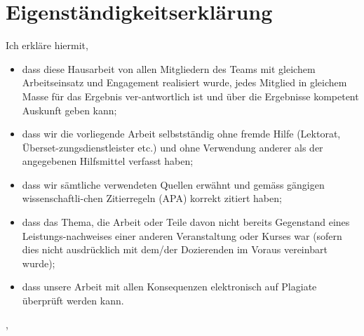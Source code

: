\section*{Eigenständigkeitserklärung}
Ich erkläre hiermit,
\begin{itemize}
\item dass diese Hausarbeit von allen Mitgliedern des Teams mit gleichem Arbeitseinsatz und Engagement realisiert wurde, jedes Mitglied in gleichem Masse für das Ergebnis ver-antwortlich ist und über die Ergebnisse kompetent Auskunft geben kann;
\item dass wir die vorliegende Arbeit selbstständig ohne fremde Hilfe (Lektorat, Überset-zungsdienstleister etc.) und ohne Verwendung anderer als der angegebenen Hilfsmittel verfasst haben;
\item dass wir sämtliche verwendeten Quellen erwähnt und gemäss gängigen wissenschaftli-chen Zitierregeln (APA) korrekt zitiert haben;
\item dass das Thema, die Arbeit oder Teile davon nicht bereits Gegenstand eines Leistungs-nachweises einer anderen Veranstaltung oder Kurses war (sofern dies nicht ausdrücklich mit dem/der Dozierenden im Voraus vereinbart wurde);
\item dass unsere Arbeit mit allen Konsequenzen elektronisch auf Plagiate überprüft werden kann.
\end{itemize}
\vspace{1cm}
\hfill \theCity, \theDate
\\
\vspace{1.5cm}


\hfill \theAuthor
\thispagestyle{empty}
